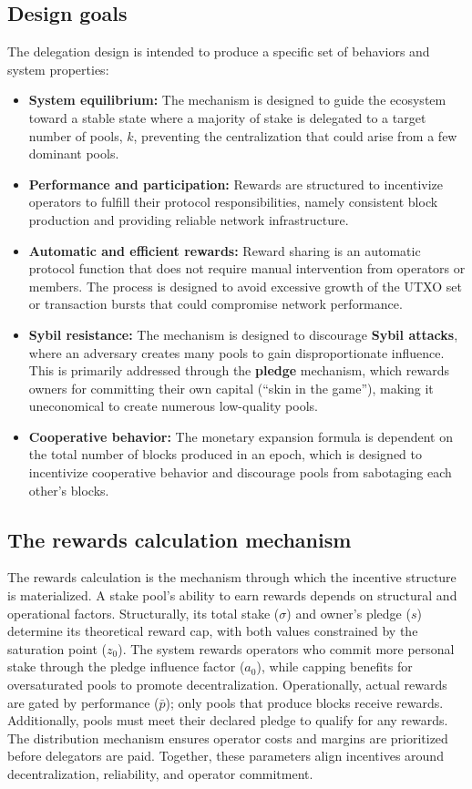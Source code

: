 \documentclass[11pt, letterpaper]{article}
\begin{document}
\subsection{Design goals}
The delegation design is intended to produce a specific set of behaviors and
system properties:
\begin{itemize}
	\item \textbf{System equilibrium:} The mechanism is designed to guide the ecosystem toward a stable state
	      where a majority of stake is delegated to a target number of pools, \textbf{$k$}, preventing the
	      centralization that could arise from a few dominant pools.
	\item \textbf{Performance and participation:} Rewards are structured to incentivize operators to fulfill
	      their protocol responsibilities, namely consistent block production and providing reliable network
	      infrastructure.
	\item \textbf{Automatic and efficient rewards:} Reward sharing is an automatic protocol function that does
	      not require manual intervention from operators or members. The process is designed to avoid excessive
	      growth of the UTXO set or transaction bursts that could compromise network performance.
	\item \textbf{Sybil resistance:} The mechanism is designed to discourage \textbf{Sybil attacks}, where an
	      adversary creates many pools to gain disproportionate influence. This is primarily addressed through the
	      \textbf{pledge} mechanism, which rewards owners for committing their own capital (``skin in the game''),
	      making it uneconomical to create numerous low-quality pools.
	\item \textbf{Cooperative behavior:} The monetary expansion formula is dependent on the total number of
	      blocks produced in an epoch, which is designed to incentivize cooperative behavior and discourage pools
	      from sabotaging each other's blocks.
\end{itemize}

\subsection{The rewards calculation mechanism}

The rewards calculation is the mechanism through which the incentive structure
is materialized. A stake pool's ability to earn rewards depends on structural
and operational factors. Structurally, its total stake ($\sigma$) and owner's
pledge ($s$) determine its theoretical reward cap, with both values constrained
by the saturation point ($z_{0}$). The system rewards operators who commit more
personal stake through the pledge influence factor ($a_{0}$), while capping
benefits for oversaturated pools to promote decentralization. Operationally,
actual rewards are gated by performance ($\bar{p}$); only pools that produce
blocks receive rewards. Additionally, pools must meet their declared pledge to
qualify for any rewards. The distribution mechanism ensures operator costs and
margins are prioritized before delegators are paid. Together, these parameters
align incentives around decentralization, reliability, and operator commitment.
\end{document}

